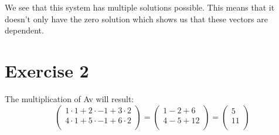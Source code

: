 \documentclass[a4paper]{article}
\begin{document}
We see that this system has multiple solutions possible. This means that it doesn't only have the zero solution which shows us that these vectors are dependent.

\section*{Exercise 2}
The multiplication of Av will result:
\[
\left(
\begin{array}{c}
1 \cdot 1 + 2 \cdot -1 + 3 \cdot 2 \\
4 \cdot 1 + 5 \cdot -1 + 6 \cdot 2 \\
\end{array}
\right)
=
\left(
\begin{array}{c}
1 - 2 + 6 \\
4 - 5 + 12 \\
\end{array}
\right)
=
\left(
\begin{array}{c}
5 \\
11 \\
\end{array}
\right)
\]
\end{document}
